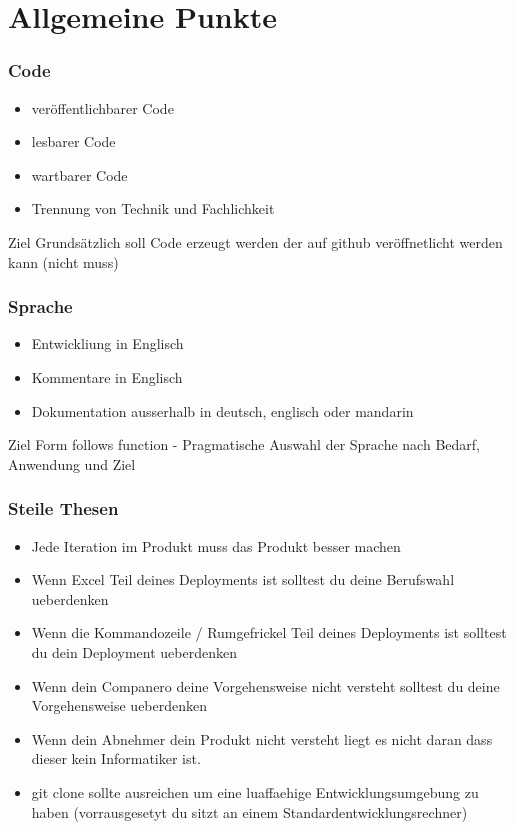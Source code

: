 \section{Allgemeine Punkte} 
\begin{frame}
\frametitle{Code} 
\begin{itemize}
\item veröffentlichbarer Code
\item lesbarer Code
\item wartbarer Code
\item Trennung von Technik und Fachlichkeit
\end{itemize}
\begin{block}{Ziel}
  Grundsätzlich soll Code erzeugt werden der auf github veröffnetlicht werden kann (nicht muss)
  \end{block}
\end{frame}
\begin{frame}
\frametitle{Sprache} 
\begin{itemize}
\item Entwickliung in Englisch
\item Kommentare in Englisch
\item Dokumentation ausserhalb in deutsch, englisch oder mandarin
\end{itemize}
\begin{block}{Ziel}
  Form follows function - Pragmatische Auswahl der Sprache nach Bedarf, Anwendung und Ziel
  \end{block}
\end{frame}
\begin{frame}
    \frametitle{Steile Thesen} 
    \begin{itemize}
    \item Jede Iteration im Produkt muss das Produkt besser machen
    \item Wenn Excel Teil deines Deployments ist solltest du deine Berufswahl ueberdenken
    \item Wenn die Kommandozeile / Rumgefrickel Teil deines Deployments ist solltest du dein Deployment ueberdenken
    \item Wenn dein Companero deine Vorgehensweise nicht versteht solltest du deine Vorgehensweise ueberdenken
    \item Wenn dein Abnehmer dein Produkt nicht versteht liegt es nicht daran dass dieser kein Informatiker ist.
    \item git clone sollte ausreichen um eine luaffaehige Entwicklungsumgebung zu haben (vorrausgesetyt du sitzt an einem Standardentwicklungsrechner)
    \end{itemize}
    
    \end{frame}